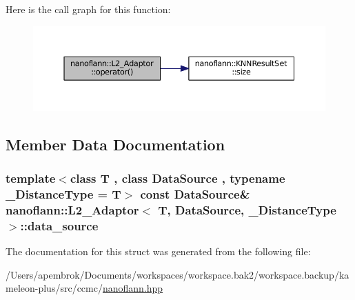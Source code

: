 Here is the call graph for this function\-:
\nopagebreak
\begin{figure}[H]
\begin{center}
\leavevmode
\includegraphics[width=350pt]{structnanoflann_1_1_l2___adaptor_a70fe24865199691cf988d83ccc76cee8_cgraph}
\end{center}
\end{figure}




\subsection{Member Data Documentation}
\hypertarget{structnanoflann_1_1_l2___adaptor_aa108fd57fd3336ea825cb62f7f5b531b}{
\subsubsection[{data\-\_\-source}]{\setlength{\rightskip}{0pt plus 5cm}template$<$class T , class Data\-Source , typename \-\_\-\-Distance\-Type  = T$>$ const Data\-Source\& {\bf nanoflann\-::\-L2\-\_\-\-Adaptor}$<$ T, Data\-Source, \-\_\-\-Distance\-Type $>$\-::data\-\_\-source}}\label{structnanoflann_1_1_l2___adaptor_aa108fd57fd3336ea825cb62f7f5b531b}


The documentation for this struct was generated from the following file\-:\begin{DoxyCompactItemize}
\item 
/\-Users/apembrok/\-Documents/workspaces/workspace.\-bak2/workspace.\-backup/kameleon-\/plus/src/ccmc/\hyperlink{nanoflann_8hpp}{nanoflann.\-hpp}\end{DoxyCompactItemize}
